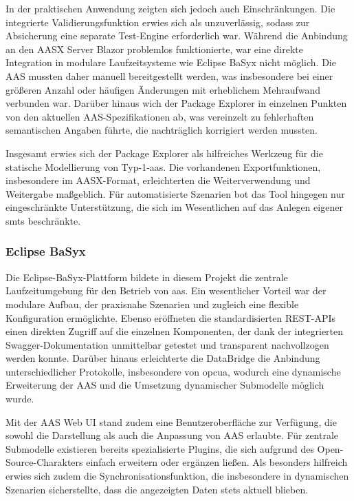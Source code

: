 In der praktischen Anwendung zeigten sich jedoch auch Einschränkungen.
Die integrierte Validierungsfunktion erwies sich als unzuverlässig, sodass zur Absicherung eine separate Test-Engine erforderlich war.
Während die Anbindung an den AASX Server Blazor problemlos funktionierte, war eine direkte Integration in modulare Laufzeitsysteme wie Eclipse BaSyx nicht möglich.
Die AAS mussten daher manuell bereitgestellt werden, was insbesondere bei einer größeren Anzahl oder häufigen Änderungen mit erheblichem Mehraufwand verbunden war.
Darüber hinaus wich der Package Explorer in einzelnen Punkten von den aktuellen AAS-Spezifikationen ab, was vereinzelt zu fehlerhaften semantischen Angaben führte, die nachträglich korrigiert werden mussten.

Insgesamt erwies sich der Package Explorer als hilfreiches Werkzeug für die statische Modellierung von Typ-1-\acs{aas}.
Die vorhandenen Exportfunktionen, insbesondere im AASX-Format, erleichterten die Weiterverwendung und Weitergabe maßgeblich.
Für automatisierte Szenarien bot das Tool hingegen nur eingeschränkte Unterstützung, die sich im Wesentlichen auf das Anlegen eigener \acsp{smt} beschränkte.

\newpage
\subsubsection{Eclipse BaSyx}

Die Eclipse-BaSyx-Plattform bildete in diesem Projekt die zentrale Laufzeitumgebung für den Betrieb von \acs{aas}.
Ein wesentlicher Vorteil war der modulare Aufbau, der praxisnahe Szenarien und zugleich eine flexible Konfiguration ermöglichte.
Ebenso eröffneten die standardisierten REST-APIs einen direkten Zugriff auf die einzelnen Komponenten, der dank der integrierten Swagger-Dokumentation unmittelbar getestet und transparent nachvollzogen werden konnte.
Darüber hinaus erleichterte die DataBridge die Anbindung unterschiedlicher Protokolle, insbesondere von \acs{opcua}, wodurch eine dynamische Erweiterung der AAS und die Umsetzung dynamischer Submodelle möglich wurde.

Mit der AAS Web UI stand zudem eine Benutzeroberfläche zur Verfügung, die sowohl die Darstellung als auch die Anpassung von AAS erlaubte. 
Für zentrale Submodelle existieren bereits spezialisierte Plugins, die sich aufgrund des Open-Source-Charakters einfach erweitern oder ergänzen ließen.
Als besonders hilfreich erwies sich zudem die Synchronisationsfunktion, die insbesondere in dynamischen Szenarien sicherstellte, dass die angezeigten Daten stets aktuell blieben.

